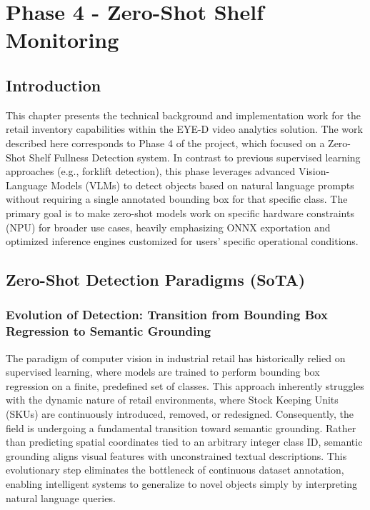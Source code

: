 ﻿\chapter{Phase 4 - Zero-Shot Shelf Monitoring}
\setcounter{section}{0}
\renewcommand{\thesection}{\arabic{section}}
\label{chap:phase4-zeroshot}

\section{Introduction}
This chapter presents the technical background and implementation work for the retail inventory capabilities within the EYE-D video analytics solution. The work described here corresponds to Phase 4 of the project, which focused on a Zero-Shot Shelf Fullness Detection system. In contrast to previous supervised learning approaches (e.g., forklift detection), this phase leverages advanced Vision-Language Models (VLMs) to detect objects based on natural language prompts without requiring a single annotated bounding box for that specific class. The primary goal is to make zero-shot models work on specific hardware constraints (NPU) for broader use cases, heavily emphasizing ONNX exportation and optimized inference engines customized for users' specific operational conditions.

\section{Zero-Shot Detection Paradigms (SoTA)}

\subsection{Evolution of Detection: Transition from Bounding Box Regression to Semantic Grounding}
The paradigm of computer vision in industrial retail has historically relied on supervised learning, where models are trained to perform bounding box regression on a finite, predefined set of classes. This approach inherently struggles with the dynamic nature of retail environments, where Stock Keeping Units (SKUs) are continuously introduced, removed, or redesigned. Consequently, the field is undergoing a fundamental transition toward semantic grounding. Rather than predicting spatial coordinates tied to an arbitrary integer class ID, semantic grounding aligns visual features with unconstrained textual descriptions. This evolutionary step eliminates the bottleneck of continuous dataset annotation, enabling intelligent systems to generalize to novel objects simply by interpreting natural language queries.

